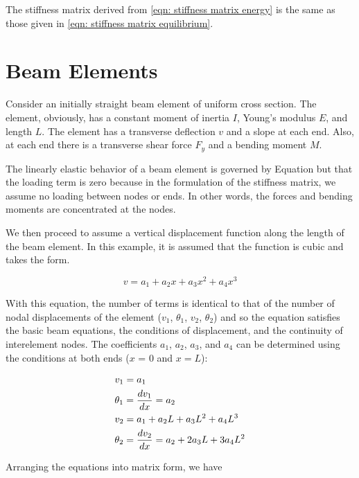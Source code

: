 \documentclass[a4paper,openany,12pt]{book}
\begin{document}
{{The stiffness matrix derived from \ref{eqn: stiffness matrix energy} is the same as those given in \ref{eqn: stiffness matrix equilibrium}.

\section{Beam Elements}
\label{beam-elements}
Consider an initially straight beam element of uniform cross section.
The element, obviously, has a constant moment of inertia \(I\), Young's
modulus \(E\), and length \(L\). The element has a transverse deflection \(v\)
and a slope at each end. Also, at each end there is a transverse shear
force \(F_y\) and a bending moment \(M\).

The linearly elastic behavior of a beam element is governed by Equation
but that the loading term is zero because in the formulation of the
stiffness matrix, we assume no loading between nodes or ends. In other
words, the forces and bending moments are concentrated at the nodes.

We then proceed to assume a vertical displacement function along the
length of the beam element. In this example, it is assumed that the
function is cubic and takes the form.

$$ v = a_1 + a_2x + a_3x^2 + a_4x^3$$

With this equation, the number of terms is identical to that of the
number of nodal displacements of the element (\(v_1\), \(\theta_1\), \(v_2\),
\(\theta_2\)) and so the equation satisfies the basic beam equations, the
conditions of displacement, and the continuity of interelement nodes.
The coefficients \(a_1\), \(a_2\), \(a_3\), and \(a_4\) can be determined using
the conditions at both ends (\(x\) = 0 and \(x = L\)):

\begin{gather*}
  v_1 = a_1 \hfill \\
  \theta _1 = \frac{dv_1}{dx} = a_2 \hfill \\
  v_2 = a_1 + a_2L + a_3L^2 + a_4L^3 \hfill \\
  \theta_2 = \frac{dv_2}{dx} = a_2 + 2a_3L + 3a_4L^2 \hfill \\ 
\end{gather*}

Arranging the equations into matrix form, we have

}}
\end{document}
